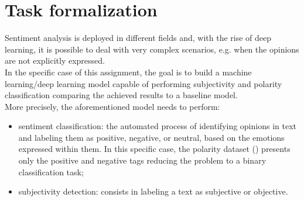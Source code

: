 
\section{Task formalization}
Sentiment analysis is deployed in different fields %
and, with the rise of deep learning, it is possible to deal with very complex scenarios, e.g. when the opinions are not explicitly expressed.\\
In the specific case of this assignment, the goal is to build a machine learning/deep learning model capable of performing subjectivity and polarity classification comparing 
the achieved results to a baseline model.\\
More precisely, the aforementioned model needs to perform:
\begin{itemize}
    \item sentiment classification: the automated process of identifying opinions in text and labeling them as positive, negative, or neutral, based on the emotions expressed
        within them. In this specific case, the polarity dataset (\textbf{}) presents only the positive and negative tags reducing the problem to a binary classification task;
    \item subjectivity detection: consists in labeling a text as subjective or objective.
\end{itemize}


